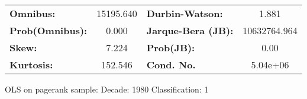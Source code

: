 \begin{center}
\begin{tabular}{lccccc}
\end{tabular}
\begin{tabular}{lclc}
\textbf{Omnibus:}       & 15195.640 & \textbf{  Durbin-Watson:     } &      1.881    \\
\textbf{Prob(Omnibus):} &    0.000  & \textbf{  Jarque-Bera (JB):  } & 10632764.964  \\
\textbf{Skew:}          &    7.224  & \textbf{  Prob(JB):          } &       0.00    \\
\textbf{Kurtosis:}      &  152.546  & \textbf{  Cond. No.          } &   5.04e+06    \\
\bottomrule
\end{tabular}
\end{center}
\break
OLS on pagerank sample: Decade: 1980 Classification: 1
